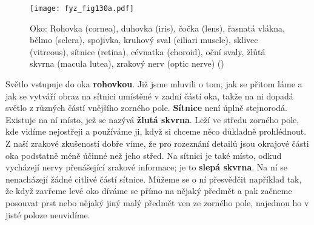 {    \begin{figure}[ht!]  %
      \centering
      \texttt{[image: fyz\_fig130a.pdf]}
      \caption{Oko: Rohovka (cornea), duhovka (iris), čočka (lens), řasnatá vlákna, bělmo 
              (sclera), spojivka, kruhový sval (ciliari muscle), sklivec (vitreous), sítnice 
              (retina), cévnatka (choroid), oční svaly, žlůtá skvrna (macula lutea), zrakový 
              nerv (optic nerve) 
              (\cite[s.~468]{Feynman01})}
      \label{fyz:fig130a}
    \end{figure} 

    Světlo vstupuje do oka \textbf{rohovkou}. Již jsme mluvili o tom, jak se přitom láme a jak se 
    vytváří obraz na sítnici umístěné v zadní částí oka, takže na ni dopadá světlo z různých částí 
    vnějšího zorného pole. \textbf{Sítnice} není úplně stejnorodá. Existuje na ní místo, jež se 
    nazývá \textbf{žlutá skvrna}. Leží ve středu zorného pole, kde vidíme nejostřeji a používáme 
    ji, když si chceme něco důkladně prohlédnout. Z naší zrakové zkušeností dobře víme, že pro 
    rozeznání detailů jsou okrajové části oka podstatně méně účinné než jeho střed. Na sítnici je 
    také místo, odkud vycházejí nervy přenášející zrakové informace; je to \textbf{slepá skvrna}. 
    Na ní se nenacházejí žádné citlivé částí sítnice. Můžeme se o ní přesvědčit například tak, že 
    když zavřeme levé oko díváme se přímo na nějaký předmět a pak začneme posouvat prst nebo nějaký 
    jiný malý předmět ven ze zorného pole, najednou ho v jisté poloze neuvidíme. 
    
}
